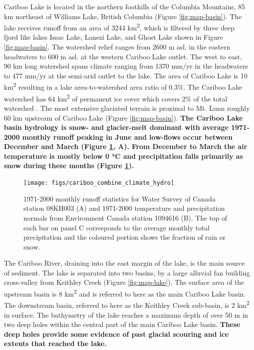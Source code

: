 \documentclass[Royal,times,doublespace,sageh]{sagej}
\begin{document}
Cariboo Lake is located in the northern foothills of the Columbia
Mountains, 85 km northeast of Williams Lake, British Columbia (Figure
\ref{fig:map-basin}). The lake receives runoff from an area of 3244
km\textsuperscript{2}, which is filtered by three deep fjord like lakes
Issac Lake, Lanezi Lake, and Ghost Lake shown in Figure
\ref{fig:map-basin}. The watershed relief ranges from 2600 m asl. in the
eastern headwaters to 600 m asl. at the western Cariboo Lake outlet. The
west to east, 90 km long watershed spans climate ranging from 1370 mm/yr
in the headwaters to 477 mm/yr at the semi-arid outlet to the lake. The
area of Cariboo Lake is 10 km\textsuperscript{2} resulting in a lake
area-to-watershed area ratio of 0.3\%. The Cariboo Lake watershed has 64
km\textsuperscript{2} of permanent ice cover which covers 2\% of the
total watershed \citep{Bolch2008}. The most extensive glaciated terrain
is proximal to Mt. Lunn roughly 60 km upstream of Cariboo Lake (Figure
\ref{fig:map-basin}). \textbf{The Cariboo Lake basin hydrology is snow-
and glacier-melt dominant with average 1971-2000 monthly runoff peaking
in June and low-flows occur between December and March (Figure
\ref{fig:cl-hydro}, A). From December to March the air temperature is
mostly below 0 °C and precipitation falls primarily as snow during these
months (Figure \ref{fig:cl-hydro}).}

\begin{figure}

{\centering \texttt{[image: figs/cariboo\_combine\_climate\_hydro]} 

}

\caption{1971-2000 monthly runoff statistics for Water Survey of Canada station 08KH003 (A) and 1971-2000 temperature and precipitation normals from Environment Canada station 1094616 (B). The top of each bar on panel C corresponds to the average monthly total precipitation and the coloured portion shows the fraction of rain or snow.}\label{fig:cl-hydro}
\end{figure}

The Cariboo River, draining into the east margin of the lake, is the
main source of sediment. The lake is separated into two basins, by a
large alluvial fan building cross-valley from Keithley Creek (Figure
\ref{fig:map-lake}). The surface area of the upstream basin is 8
km\textsuperscript{2} and is referred to here as the main Cariboo Lake
basin. The downstream basin, referred to here as the Keithley Creek
sub-basin, is 2 km\textsuperscript{2} in surface. The bathymetry of the
lake reaches a maximum depth of over 50 m in two deep holes within the
central part of the main Cariboo Lake basin. \textbf{These deep holes
provide some evidence of past glacial scouring and ice extents that
reached the lake.}
\end{document}
